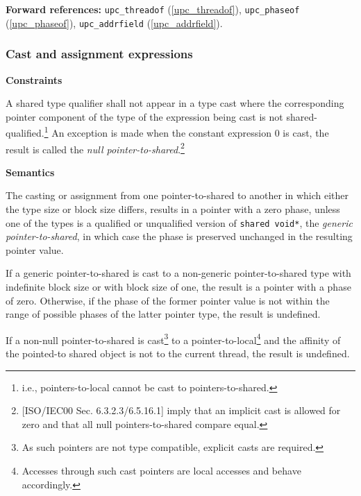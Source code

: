 {\bf Forward references:}  {\tt upc\_threadof} (\ref{upc_threadof}),
          {\tt upc\_phaseof} (\ref{upc_phaseof}), {\tt upc\_addrfield} (\ref{upc_addrfield}). 

\subsubsection{Cast and assignment expressions}

{\bf Constraints} 

\npf A shared type qualifier shall not appear in a type cast
    where the corresponding pointer component of the type of the expression
    being cast is not shared-qualified.\footnote{i.e., pointers-to-local
    cannot be cast to pointers-to-shared.}  An exception is made when the constant
    expression 0 is cast, the result is called the {\em null 
    pointer-to-shared}.\footnote{[ISO/IEC00 Sec.
    6.3.2.3/6.5.16.1] imply that an implicit cast is allowed for zero
    and that all null pointers-to-shared compare equal.}

{\bf Semantics} 

\np The casting or assignment from one pointer-to-shared 
    to another in which either the type size or block size differs,
    results in 
    a pointer with a zero phase, unless one of the types is a qualified or
    unqualified version of {\tt shared void*}, the {\em generic pointer-to-shared},
    in which case the phase is preserved unchanged in the resulting
    pointer value.
    
\np If a generic pointer-to-shared is cast to a non-generic 
     pointer-to-shared type with indefinite block size or with block size of 
     one, the result is a pointer with a phase of zero.  Otherwise, if the
     phase of the former pointer value is not within the range of possible
     phases of the latter pointer type, the result is undefined.
  
\np If a non-null pointer-to-shared is cast\footnote{As such pointers
     are not type compatible, explicit casts are required.} to a
     pointer-to-local\footnote{Accesses through such cast pointers are
     local accesses and behave accordingly.} and the affinity
     of the pointed-to shared object is not to the current thread, the result is
     undefined.
     
